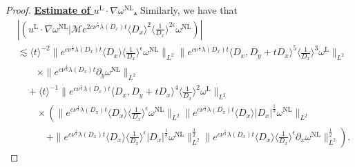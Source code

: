 \documentclass[reqno, 12pt]{amsart} %
\theoremstyle{plain} %
\theoremstyle{definition}
\theoremstyle{remark}
\numberwithin{equation}{section} %
\newcommand{\lt}{\left}
\newcommand{\rt}{\right}
\newcommand{\px}{\partial_x}
\newcommand{\py}{\partial_y}
\begin{document}
\begin{proof}
		
		\underline{\bf Estimate of $  u^{\mathrm{L}} \cdot  \nabla \omega^{\mathrm{NL}}$.} Similarly, we have that
		\begin{align*} 
			&\left|\left(  u^{\mathrm{L}} \cdot\nabla \omega^{\mathrm{NL}} \big| \mathcal{M} e^{2 c \nu^{\frac{1}{3}} \lambda\left(D_x\right) t}\langle D_x\rangle^2\langle\frac{1}{D_x}\rangle^{2 \epsilon} \omega^{\mathrm{NL}} \right)\right| \\
			&\lesssim \langle t\rangle^{-2} \|e^{c \nu^{\frac{1}{3}} \lambda\left(D_x\right) t}\langle D_x\rangle  \langle \frac{1}{D_x}\rangle^\epsilon \omega^{\mathrm{NL}}\|_{L^2}    \|e^{c \nu^{\frac{1}{3}} \lambda\left(D_x\right) t}\langle D_x, D_y + tD_x\rangle^ 5 \langle\frac{1}{D_x}\rangle^3 \omega^{\mathrm{L}} \|_{L^2} \\
			&\qquad \times \|e^{c \nu^{\frac{1}{3}} \lambda\left(D_x\right) t} \py \omega^{\mathrm{NL}} \|_{L^2} \\
			&\quad +  \langle t\rangle^{-1}     \|e^{c \nu^{\frac{1}{3}} \lambda\left(D_x\right) t}\langle D_x, D_y+t D_x\rangle^4\langle\frac{1}{D_x}\rangle^2 \omega^{\mathrm{L}}\|_{L^2} \\
			& \qquad \times \left(\|e^{c \nu^{\frac{1}{3}} \lambda\left(D_x\right) t}\langle D_x\rangle\langle\frac{1}{D_x}\rangle^\epsilon \omega^{\mathrm{NL}}\|_{L^2}  \| e^{c \nu^{\frac{1}{3}} \lambda\left(D_x\right) t} \langle D_x \rangle
			\left|D_x\right|^{\frac{1}{3}}  \omega^{\mathrm{NL}} \|_{L^2} \rt.\\
			&\qquad \quad  \lt.+ \|e^{c \nu^{\frac{1}{3}} \lambda\left(D_x\right) t}\langle D_x\rangle\langle\frac{1}{D_x}\rangle^\epsilon\left|D_x\right|^{\frac{1}{3}}  \omega^{\mathrm{NL}}\|_{L^2}^{\frac{3}{2}}   \|e^{c \nu^{\frac{1}{3}} \lambda\left(D_x\right) t}\langle D_x\rangle\langle\frac{1}{D_x}\rangle^\epsilon \px \omega^{\mathrm{NL}}\|_{L^2}^{\frac{1}{2}}\right).
		\end{align*}
		

\end{proof}
\end{document}
